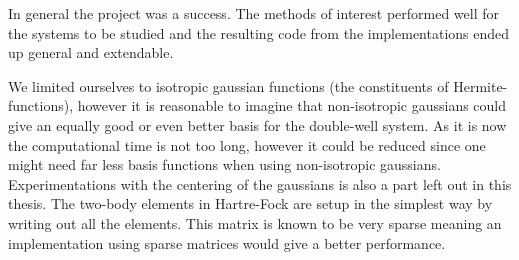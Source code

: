     In general the project was a success. The methods of interest performed
    well for the systems to be studied and the resulting code from the
    implementations ended up general and extendable.

    We limited ourselves to isotropic gaussian functions (the constituents of
    Hermite-functions), however it is reasonable to imagine that non-isotropic
    gaussians could give an equally good or even better basis for the
    double-well system. As it is now the computational time is not too long,
    however it could be reduced since one might need far less basis functions
    when using non-isotropic gaussians. Experimentations with the centering of
    the gaussians is also a part left out in this thesis. The two-body elements
    in Hartre-Fock are setup in the simplest way by writing out all the
    elements. This matrix is known to be very sparse meaning an implementation
    using sparse matrices would give a better performance.
